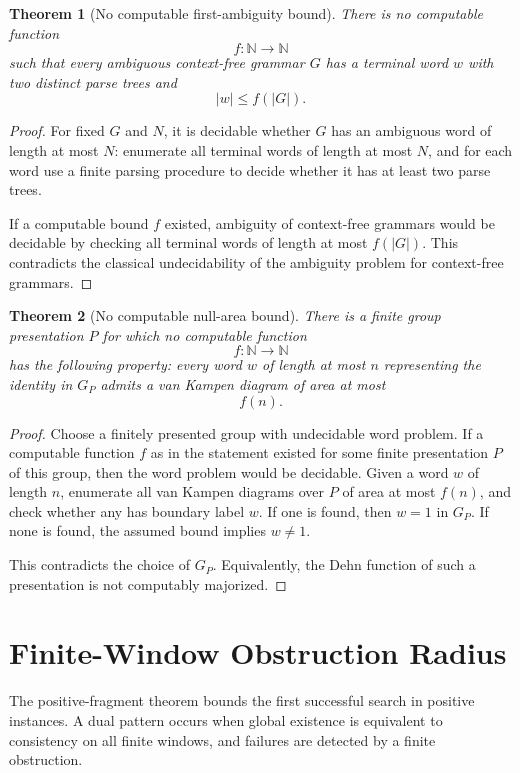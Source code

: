 \documentclass[11pt]{article}
\newtheorem{theorem}{Theorem}[section]
\begin{document}
\begin{theorem}[No computable first-ambiguity bound]
There is no computable function
\[
f:\mathbb N\to\mathbb N
\]
such that every ambiguous context-free grammar \(G\) has a terminal word \(w\) with two distinct parse trees and
\[
|w|\leq f(|G|).
\]
\end{theorem}

\begin{proof}
For fixed \(G\) and \(N\), it is decidable whether \(G\) has an ambiguous word of length at most \(N\): enumerate all terminal words of length at most \(N\), and for each word use a finite parsing procedure to decide whether it has at least two parse trees.

If a computable bound \(f\) existed, ambiguity of context-free grammars would be decidable by checking all terminal words of length at most \(f(|G|)\). This contradicts the classical undecidability of the ambiguity problem for context-free grammars.
\end{proof}

\begin{theorem}[No computable null-area bound]
There is a finite group presentation \(P\) for which no computable function
\[
f:\mathbb N\to\mathbb N
\]
has the following property: every word \(w\) of length at most \(n\) representing the identity in \(G_P\) admits a van Kampen diagram of area at most
\[
f(n).
\]
\end{theorem}

\begin{proof}
Choose a finitely presented group with undecidable word problem. If a computable function \(f\) as in the statement existed for some finite presentation \(P\) of this group, then the word problem would be decidable. Given a word \(w\) of length \(n\), enumerate all van Kampen diagrams over \(P\) of area at most \(f(n)\), and check whether any has boundary label \(w\). If one is found, then \(w=1\) in \(G_P\). If none is found, the assumed bound implies \(w\neq1\).

This contradicts the choice of \(G_P\). Equivalently, the Dehn function of such a presentation is not computably majorized.
\end{proof}

\section{Finite-Window Obstruction Radius}

The positive-fragment theorem bounds the first successful search in positive instances. A dual pattern occurs when global existence is equivalent to consistency on all finite windows, and failures are detected by a finite obstruction.
\end{document}

